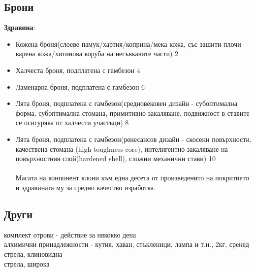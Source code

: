 \subsection{Брони}
\textbf{Здравина}:
\begin{itemize}[topsep=-0cm, partopsep=0cm, parsep=0cm, itemsep=0cm]
\item{Кожена броня(слоеве памук/хартия/коприна/мека кожа, със зашити плочи варена кожа/хитинова коруба на негъвкавите части) 2}
\item{Халчеста броня, подплатена с гамбезон 4}
\item{Ламенарна броня, подплатена с гамбезон 6}
\item{Лята броня, подплатена с гамбезон(средновековен дизайн - субоптимална форма, субоптимална стомана, примитивно закаляване, подвижност в ставите се осигурява от халчести участъци) 8}
\item{Лята броня, подплатена с гамбезон(ренесансов дизайн - скосени повърхности, качествена стомана (high toughness core),  интелигентно закаляване на повърхностния слой(hardened shell), сложни механични стави) 10}
\\
\\
Масата на конпонент клони към една десета от произведенито на покритието и здравината му за средно качество изработка.
\end{itemize}

\subsection{Други}
комплект отрови - действие за някокко дена \\
алхимични принадлежности - кутия, хаван, стъкленици, лампа и т.н., 2кг, сренед  \\
стрела, клиновидна  \\
стрела, широка  \\
